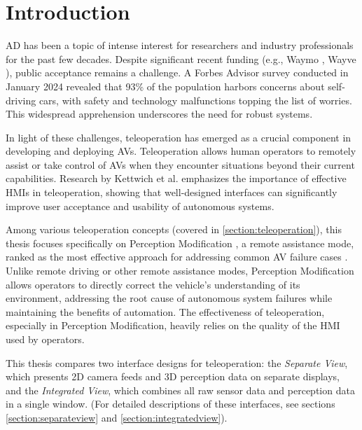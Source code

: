 
\chapter{Introduction}\label{chapter:introduction}

\ac{AD} has been a topic of intense interest for researchers and
industry professionals for the past few decades.
Despite significant recent funding (e.g., Waymo \cite{waymo2024funding}, Wayve \cite{wayve2024funding}), public acceptance remains a challenge.
A Forbes Advisor survey \cite{forbes2024} conducted in January 2024 revealed that 93\% of the population harbors
concerns about self-driving cars, with safety and technology malfunctions topping the
list of worries.
This widespread apprehension underscores the need for robust systems.

In light of these challenges, teleoperation has emerged as a crucial component
in developing and deploying \acp{AV}. Teleoperation allows
human operators to remotely assist or take control of \acp{AV} when they
encounter situations beyond their current capabilities. Research by Kettwich et al. \cite{Kettwich}
emphasizes the importance of effective \acp{HMI} in
teleoperation, showing that well-designed interfaces can significantly improve user
acceptance and usability of autonomous systems.

Among various teleoperation concepts (covered in \ref{section:teleoperation}), this thesis focuses specifically on Perception Modification \cite{Feiler2021ThePM},
a remote assistance mode, ranked as the most effective approach for
addressing common \ac{AV} failure cases \cite{Brecht}. Unlike remote driving or other remote assistance modes,
Perception Modification allows operators to directly correct the vehicle's understanding of its environment, addressing the root cause of autonomous system failures while maintaining the benefits of automation.
The effectiveness of
teleoperation, especially in Perception Modification, heavily relies on the quality of the \ac{HMI} used by operators.

This thesis compares two interface designs for teleoperation: the \emph{Separate View},
which presents 2D camera feeds and 3D perception data on separate displays, and
the \emph{Integrated View}, which combines all raw sensor data and perception data in a single window.
(For detailed descriptions of these interfaces, see sections \ref{section:separateview} and \ref{section:integratedview}).

